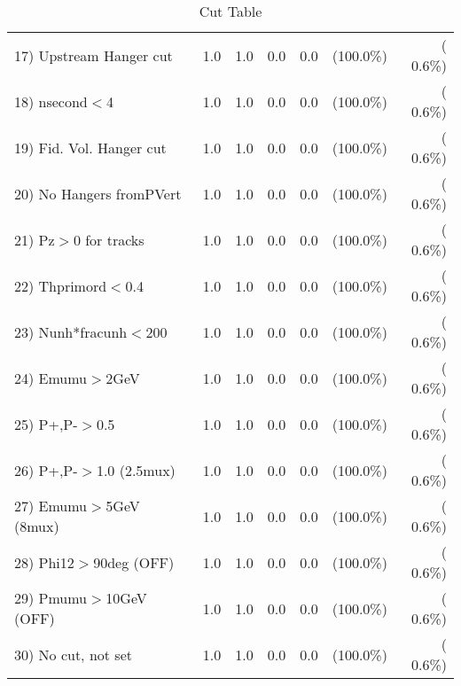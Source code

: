 \begin{table}[h!]
\begin{tabular}{||l||r|r|r|r|r|r||}
 17) Upstream Hanger cut  &          1.0 &          1.0 &          0.0 &          0.0 & (100.0\%) & (  0.6\%) \\
 18) nsecond$<$4          &          1.0 &          1.0 &          0.0 &          0.0 & (100.0\%) & (  0.6\%) \\
 19) Fid. Vol. Hanger cut &          1.0 &          1.0 &          0.0 &          0.0 & (100.0\%) & (  0.6\%) \\
 20) No Hangers fromPVert &          1.0 &          1.0 &          0.0 &          0.0 & (100.0\%) & (  0.6\%) \\
 21) Pz$>$0 for tracks    &          1.0 &          1.0 &          0.0 &          0.0 & (100.0\%) & (  0.6\%) \\
 22) Thprimord$<$0.4      &          1.0 &          1.0 &          0.0 &          0.0 & (100.0\%) & (  0.6\%) \\
 23) Nunh*fracunh$<$200   &          1.0 &          1.0 &          0.0 &          0.0 & (100.0\%) & (  0.6\%) \\
 24) Emumu$>$2GeV         &          1.0 &          1.0 &          0.0 &          0.0 & (100.0\%) & (  0.6\%) \\
 25) P+,P-$>$0.5          &          1.0 &          1.0 &          0.0 &          0.0 & (100.0\%) & (  0.6\%) \\
 26) P+,P-$>$1.0 (2.5mux) &          1.0 &          1.0 &          0.0 &          0.0 & (100.0\%) & (  0.6\%) \\
 27) Emumu$>$5GeV  (8mux) &          1.0 &          1.0 &          0.0 &          0.0 & (100.0\%) & (  0.6\%) \\
 28) Phi12$>$90deg  (OFF) &          1.0 &          1.0 &          0.0 &          0.0 & (100.0\%) & (  0.6\%) \\
 29) Pmumu$>$10GeV  (OFF) &          1.0 &          1.0 &          0.0 &          0.0 & (100.0\%) & (  0.6\%) \\
 30) No cut, not set      &          1.0 &          1.0 &          0.0 &          0.0 & (100.0\%) & (  0.6\%) \\
 \hline
 \hline
 \end{tabular}
 \caption{Cut Table           }
 \label{tab-cutcohjpsi-mumu_cohphi0}
 \end{table}
